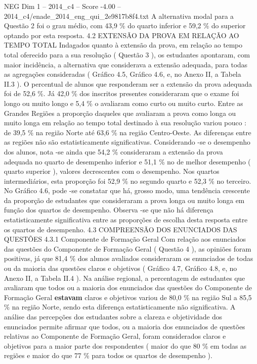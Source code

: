 \begin{textsample}{NEG Dim 1 – 2014\_c4 – Score -4.00 – 2014\_c4/enade\_2014\_eng\_qui\_2e9817b8f4.txt}
A alternativa modal para a Questão 2 foi o grau médio, com 43,9 \% do quarto inferior e 59,2 \% do superior optando por esta resposta. 4.2 EXTENSÃO DA PROVA EM RELAÇÃO AO TEMPO TOTAL Indagados quanto à extensão da prova, em relação ao tempo total oferecido para a sua resolução ( Questão 3 ), os estudantes apontaram, com maior incidência, a alternativa que considerava a extensão adequada, para todas as agregações consideradas ( Gráfico 4.5, Gráfico 4.6, e, no Anexo II, a Tabela II.3 ).
O percentual de alunos que responderam ser a extensão da prova adequada foi de 52,6 \%.
Já 42,0 \% dos inscritos presentes consideraram que o exame foi longo ou muito longo e 5,4 \% o avaliaram como curto ou muito curto.
Entre as Grandes Regiões a proporção daqueles que avaliaram a prova como longa ou muito longa em relação ao tempo total destinado à sua resolução variou pouco : de 39,5 \% na região Norte até 63,6 \% na região Centro-Oeste.
As diferenças entre as regiões não são estatisticamente significativas.
Considerando -se o desempenho dos alunos, nota -se ainda que 54,2 \% consideraram a extensão da prova adequada no quarto de desempenho inferior e 51,1 \% no de melhor desempenho ( quarto superior ), valores decrescentes com o desempenho.
Nos quartos intermediários, esta proporção foi 52,9 \% no segundo quarto e 52,3 \% no terceiro.
No Gráfico 4.6, pode -se constatar que há, grosso modo, uma tendência crescente da proporção de estudantes que consideraram a prova longa ou muito longa em função dos quartos de desempenho.
Observa -se que não há diferença estatisticamente significativa entre as proporções de escolha desta resposta entre os quartos de desempenho. 4.3 COMPREENSÃO DOS ENUNCIADOS DAS QUESTÕES 4.3.1 Componente de Formação Geral Com relação aos enunciados das questões do Componente de Formação Geral ( Questão 4 ), as opiniões foram positivas, já que 81,4 \% dos alunos avaliados consideraram os enunciados de todas ou da maioria das questões claros e objetivos ( Gráfico 4.7, Gráfico 4.8, e, no Anexo II, a Tabela II.4 ).
Na análise regional, a percentagem de estudantes que avaliaram que todos ou a maioria dos enunciados das questões do Componente de Formação Geral \textbf{estavam} claros e objetivos variou de 80,0 \% na região Sul a 85,5 \% na região Norte, sendo esta diferença estatisticamente não significativa.
A análise das percepções dos estudantes sobre a clareza e objetividade dos enunciados permite afirmar que todos, ou a maioria dos enunciados de questões relativas ao Componente de Formação Geral, foram considerados claros e objetivos para a maior parte dos respondentes ( maior do que 80 \% em todas as regiões e maior do que 77 \% para todos os quartos de desempenho ).

\end{textsample}
